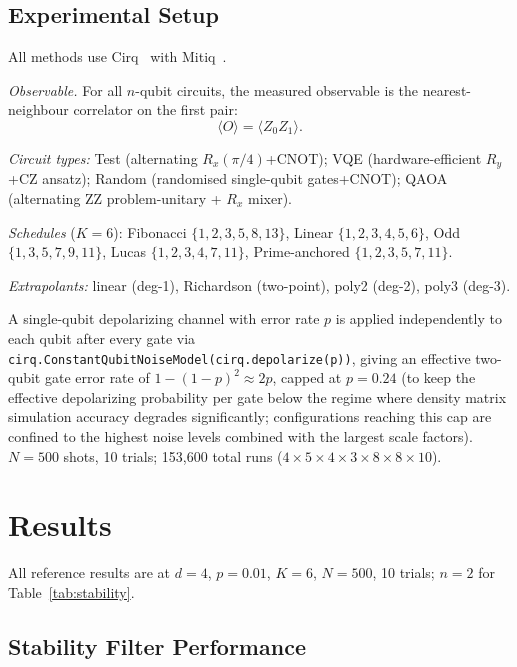 \documentclass[10pt,letterpaper]{article}
\begin{document}
\subsection{Experimental Setup}
All methods use Cirq~\cite{Cirq2023} with Mitiq~\cite{LaRose2022}.

\textit{Observable.} For all $n$-qubit circuits, the measured
observable is the nearest-neighbour correlator on the first pair:
\begin{equation}
  \langle O\rangle = \langle Z_0 Z_1\rangle.
\end{equation}

\textit{Circuit types:} Test (alternating $R_x(\pi/4)$+CNOT); VQE
(hardware-efficient $R_y$+CZ ansatz); Random (randomised single-qubit
gates+CNOT); QAOA (alternating ZZ problem-unitary + $R_x$ mixer).

\textit{Schedules} ($K=6$): Fibonacci $\{1,2,3,5,8,13\}$,
Linear $\{1,2,3,4,5,6\}$, Odd $\{1,3,5,7,9,11\}$,
Lucas $\{1,2,3,4,7,11\}$, Prime-anchored $\{1,2,3,5,7,11\}$.

\textit{Extrapolants:} linear (deg-1), Richardson (two-point),
poly2 (deg-2), poly3 (deg-3).

A single-qubit depolarizing channel with error rate $p$ is applied
independently to each qubit after every gate via
\texttt{cirq.ConstantQubitNoiseModel(\allowbreak cirq.depolarize(p))},
giving an effective two-qubit gate error rate of $1-(1-p)^{2}\approx 2p$,
capped at $p=0.24$ (to keep the effective depolarizing probability
per gate below the regime where density matrix simulation accuracy
degrades significantly; configurations reaching this cap are confined
to the highest noise levels combined with the largest scale factors).
$N=500$ shots, 10 trials;
153,600 total runs ($4\times5\times4\times3\times8\times8\times10$).

\section{Results}

All reference results are at $d=4$, $p=0.01$, $K=6$, $N=500$,
10 trials; $n=2$ for Table~\ref{tab:stability}.

\subsection{Stability Filter Performance}
\end{document}
